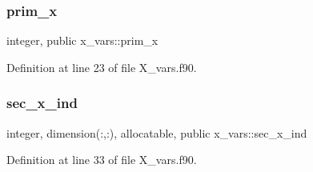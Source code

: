 \subsubsection{\texorpdfstring{prim\+\_\+x}{prim\_x}}
{\footnotesize\ttfamily integer, public x\+\_\+vars\+::prim\+\_\+x}



Definition at line 23 of file X\+\_\+vars.\+f90.

\mbox{\label{namespacex__vars_afb8de8db92ae273f2581e0545370ecac}} 
\subsubsection{\texorpdfstring{sec\+\_\+x\+\_\+ind}{sec\_x\_ind}}
{\footnotesize\ttfamily integer, dimension(\+:,\+:), allocatable, public x\+\_\+vars\+::sec\+\_\+x\+\_\+ind}



Definition at line 33 of file X\+\_\+vars.\+f90.


